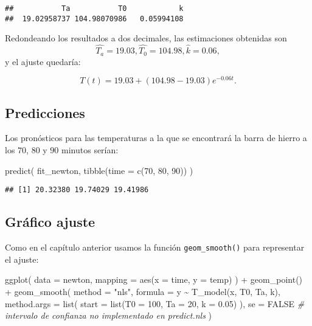 \documentclass[
  degree=mecinf,
  title=normal,
  toc=normal,
  bib=normal]{mnye}
\newenvironment{Shaded}{\begin{snugshade}}{\end{snugshade}}
\newcommand{\AttributeTok}[1]{\textcolor[rgb]{0.77,0.63,0.00}{#1}}
\newcommand{\CommentTok}[1]{\textcolor[rgb]{0.56,0.35,0.01}{\textit{#1}}}
\newcommand{\ConstantTok}[1]{\textcolor[rgb]{0.00,0.00,0.00}{#1}}
\newcommand{\DecValTok}[1]{\textcolor[rgb]{0.00,0.00,0.81}{#1}}
\newcommand{\FloatTok}[1]{\textcolor[rgb]{0.00,0.00,0.81}{#1}}
\newcommand{\FunctionTok}[1]{\textcolor[rgb]{0.00,0.00,0.00}{#1}}
\newcommand{\NormalTok}[1]{#1}
\newcommand{\SpecialCharTok}[1]{\textcolor[rgb]{0.00,0.00,0.00}{#1}}
\newcommand{\StringTok}[1]{\textcolor[rgb]{0.31,0.60,0.02}{#1}}
\begin{document}
\begin{verbatim}
##           Ta           T0            k 
##  19.02958737 104.98070986   0.05994108
\end{verbatim}

Redondeando los resultados a dos decimales, las estimaciones obtenidas son
\[\hat{T_a} = 19.03, \hat{T_0}=104.98, \hat{k}=0.06,\]
y el ajuste quedaría:

\[T(t) = 19.03 + (104.98-19.03)e^{-0.06t}.\]

\hypertarget{predicciones-1}{%
\subsection{Predicciones}\label{predicciones-1}}

Los pronósticos para las temperaturas a la que se encontrará la barra de hierro a los \(70\), \(80\) y \(90\) minutos serían:

\begin{Shaded}
\begin{Highlighting}[]
\FunctionTok{predict}\NormalTok{(}
\NormalTok{    fit\_newton,}
    \FunctionTok{tibble}\NormalTok{(}\AttributeTok{time =} \FunctionTok{c}\NormalTok{(}\DecValTok{70}\NormalTok{, }\DecValTok{80}\NormalTok{, }\DecValTok{90}\NormalTok{))}
\NormalTok{)}
\end{Highlighting}
\end{Shaded}

\begin{verbatim}
## [1] 20.32380 19.74029 19.41986
\end{verbatim}

\hypertarget{gruxe1fico-ajuste}{%
\subsection{Gráfico ajuste}\label{gruxe1fico-ajuste}}

Como en el capítulo anterior usamos la función \texttt{geom\_smooth()} para representar el ajuste:

\begin{Shaded}
\begin{Highlighting}[]
\FunctionTok{ggplot}\NormalTok{(}
    \AttributeTok{data =}\NormalTok{ newton, }
    \AttributeTok{mapping =} \FunctionTok{aes}\NormalTok{(}\AttributeTok{x =}\NormalTok{ time, }\AttributeTok{y =}\NormalTok{ temp)}
\NormalTok{) }\SpecialCharTok{+} 
    \FunctionTok{geom\_point}\NormalTok{() }\SpecialCharTok{+} 
    \FunctionTok{geom\_smooth}\NormalTok{(}
        \AttributeTok{method =} \StringTok{"nls"}\NormalTok{,}
        \AttributeTok{formula =}\NormalTok{ y }\SpecialCharTok{\textasciitilde{}} \FunctionTok{T\_model}\NormalTok{(x, T0, Ta, k),}
        \AttributeTok{method.args =} \FunctionTok{list}\NormalTok{(}
            \AttributeTok{start =} \FunctionTok{list}\NormalTok{(}\AttributeTok{T0 =} \DecValTok{100}\NormalTok{, }\AttributeTok{Ta =} \DecValTok{20}\NormalTok{, }\AttributeTok{k =} \FloatTok{0.05}\NormalTok{)}
\NormalTok{        ),}
        \AttributeTok{se =} \ConstantTok{FALSE} \CommentTok{\# intervalo de confianza no implementado en predict.nls}
\NormalTok{    )}
\end{Highlighting}
\end{Shaded}
\end{document}
